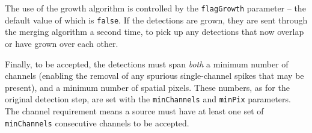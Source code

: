 The use of the growth algorithm is controlled by the
\texttt{flagGrowth} parameter -- the default value of which is
\texttt{false}. If the detections are grown, they are sent through the
merging algorithm a second time, to pick up any detections that now
overlap or have grown over each other.

Finally, to be accepted, the detections must span \emph{both} a
minimum number of channels (enabling the removal of any spurious
single-channel spikes that may be present), and a minimum number of
spatial pixels. These numbers, as for the original detection step, are
set with the \texttt{minChannels} and \texttt{minPix} parameters. The
channel requirement means a source must have at least one set of
\texttt{minChannels} consecutive channels to be
accepted.


